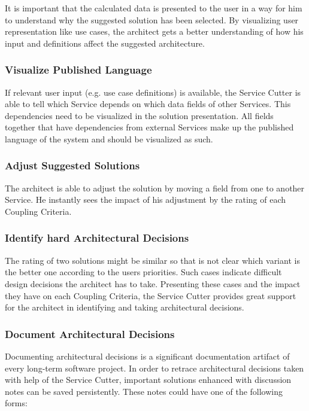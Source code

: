 It is important that the calculated data is presented to the user in a way for him to understand why the suggested solution has been selected. By visualizing user representation like use cases, the architect gets a better understanding of how his input and definitions affect the suggested architecture. 

\subsubsection{Visualize Published Language}

If relevant user input (e.g. use case definitions) is available, the Service Cutter is able to tell which Service depends on which data fields of other Services. This dependencies need to be visualized in the solution presentation. All fields together that have dependencies from external Services make up the published language of the system and should be visualized as such.

\subsubsection{Adjust Suggested Solutions}

The architect is able to adjust the solution by moving a field from one to another Service. He instantly sees the impact of his adjustment by the rating of each Coupling Criteria.

\subsubsection{Identify hard Architectural Decisions}

The rating of two solutions might be similar so that is not clear which variant is the better one according to the users priorities. Such cases indicate difficult design decisions the architect has to take. Presenting these cases and the impact they have on each Coupling Criteria, the Service Cutter provides great support for the architect in identifying and taking architectural decisions.

\subsubsection{Document Architectural Decisions}

Documenting architectural decisions is a significant documentation artifact of every long-term software project. In order to retrace architectural decisions taken with help of the Service Cutter, important solutions enhanced with discussion notes can be saved persistently. These notes could have one of the following forms:

